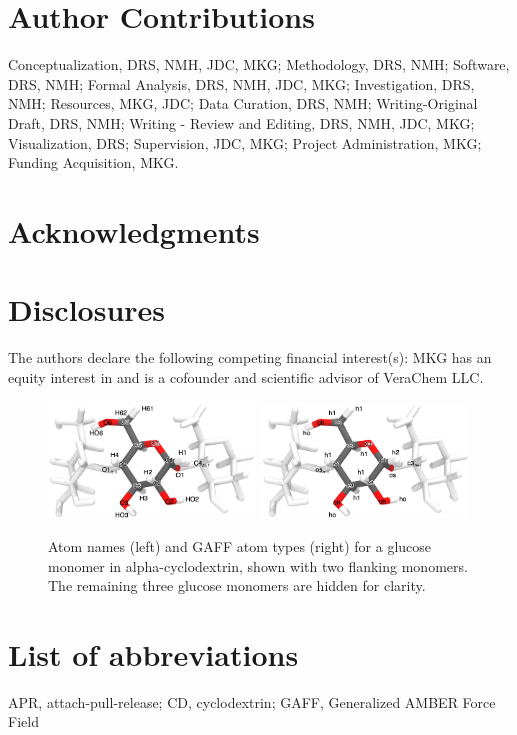 \documentclass[9pt,lineno]{elife}
\begin{document}
\section{Author Contributions}
Conceptualization, DRS, NMH, JDC, MKG; Methodology, DRS, NMH; Software, DRS, NMH; Formal Analysis, DRS, NMH, JDC, MKG; Investigation, DRS, NMH; Resources, MKG, JDC;  Data Curation, DRS, NMH; Writing-Original Draft, DRS, NMH; Writing - Review and Editing, DRS, NMH, JDC, MKG; Visualization, DRS; Supervision, JDC, MKG; Project Administration, MKG; Funding Acquisition, MKG.

\section{Acknowledgments}
\section{Disclosures}
The authors declare the following competing financial interest(s): MKG has an equity interest in and is a cofounder and scientific advisor of VeraChem LLC.




\appendix
\begin{figure}[tb]
\centering
\includegraphics[width=0.49\textwidth]{images/atom-names-trimer.png}
\includegraphics[width=0.49\textwidth]{images/gaff-atom-types.png}
\caption{Atom names (left) and GAFF atom types (right) for a glucose monomer in alpha-cyclodextrin, shown with two flanking monomers. The remaining three glucose monomers are hidden for clarity.}
\label{fig:atom-names}
\end{figure}

\section{List of abbreviations}
APR, attach-pull-release; CD, cyclodextrin; GAFF, Generalized AMBER Force Field
\end{document}
